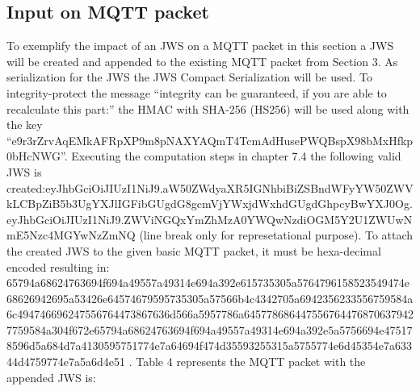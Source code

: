 \subsection{Input on MQTT packet}
To exemplify the impact of an JWS on a MQTT packet in this section a JWS will be created and appended to the existing MQTT packet from Section 3. \newline As serialization for the JWS the JWS Compact Serialization will be used.
To integrity-protect the message ``integrity can be guaranteed, if you are able to recalculate this part:'' the HMAC with SHA-256 (HS256) will be used along with the key ``e9r3rZrvAqEMkAFRpXP9m8pNAXYAQmT4TcmAdHusePWQBspX98bM\newline xHfkp0bHcNWG''.\newline
Executing the computation steps in chapter 7.4 the following valid JWS is created:\newline eyJhbGciOiJIUzI1NiJ9.aW50ZWdyaXR5IGNhbiBiZSBndWFyYW50ZWVkLC\newline BpZiB5b3UgYXJlIGFibGUgdG8gcmVjYWxjdWxhdGUgdGhpcyBwYXJ0Og.ey\newline JhbGciOiJIUzI1NiJ9.ZWViNGQxYmZhMzA0YWQwNzdiOGM5Y2U1ZWUwN\newline mE5Nzc4MGYwNzZmNQ (line break only for represetational purpose). \newline
To attach the created JWS to the given basic MQTT packet, it must be hexa-decimal encoded resulting in: \newline 65794a68624763694f694a49557a49314e694a392e615735305a576479615852354947\newline4e68626942695a53426e64574679595735305a57566b4c4342705a6942356233556759\newline584a6c494746696247556764473867636d566a5957786a645778686447556764476870\newline6379427759584a304f672e65794a68624763694f694a49557a49314e694a392e5a5756\newline694e475178596d5a684d7a4130595751774e7a64694f474d35593255315a5755774e6\newline d45354e7a63344d4759774e7a5a6d4e51 . \newline Table 4 represents the MQTT packet with the appended JWS is:

